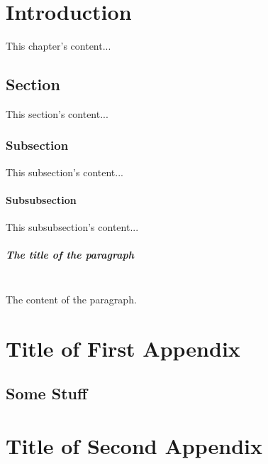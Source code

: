 \documentclass[12pt,letterpaper,oneside]{report}
\begin{document}



\newpage
{}
\doublespacing %

\chapter{Introduction}
This chapter's content...

\section{Section}
This section's content...

\subsection{Subsection}
This subsection's content...

\subsubsection{Subsubsection}
This subsubsection's content...

\paragraph{The title of the paragraph}~\\
The content of the paragraph.



\appendix
\chapter{Title of First Appendix}
\section{Some Stuff}
\chapter{Title of Second Appendix}

\end{document}
